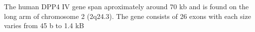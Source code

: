 The human DPP4 IV gene span aproximately around 70 kb and is found on the long arm of chromosome 2 (2q24.3). The gene consists of 26 exons with each size varies from 45 b to 1.4 kB